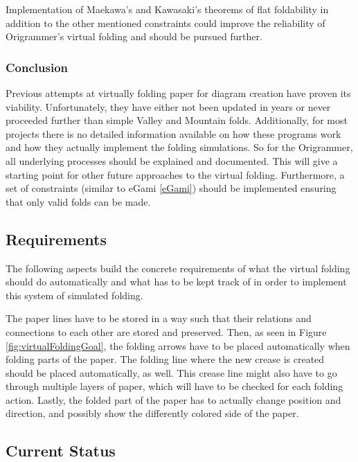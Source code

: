 \noindent Implementation of Maekawa's and Kawasaki's theorems of flat foldability\cite{hull1994mathematics} in addition to the other mentioned constraints could improve the reliability of Origrammer's virtual folding and should be pursued further.

\subsubsection{Conclusion}

\noindent Previous attempts at virtually folding paper for diagram creation have proven its viability. Unfortunately, they have either not been updated in years or never proceeded further than simple Valley and Mountain folds. Additionally, for most projects there is no detailed information available on how these programs work and how they actually implement the folding simulations. So for the Origrammer, all underlying processes should be explained and documented. This will give a starting point for other future approaches to the virtual folding. Furthermore, a set of constraints (similar to eGami \ref{eGami}) should be implemented ensuring that only valid folds can be made.

\newpage
\subsection{Requirements}

The following aspects build the concrete requirements of what the virtual folding should do automatically and what has to be kept track of in order to implement this system of simulated folding.

The paper lines have to be stored in a way such that their relations and connections to each other are stored and preserved. Then, as seen in Figure \ref{fig:virtualFoldingGoal}, the folding arrows have to be placed automatically when folding parts of the paper. The folding line where the new crease is created should be placed automatically, as well. This crease line might also have to go through multiple layers of paper, which will have to be checked for each folding action. Lastly, the folded part of the paper has to actually change position and direction, and possibly show the differently colored side of the paper.

\subsection{Current Status}

